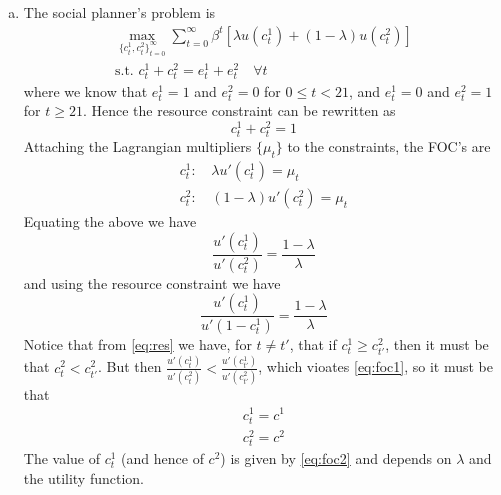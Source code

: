 \documentclass{article}
\begin{document}
\section{}

\begin{enumerate}[(a)]
  \item The social planner's problem is
    \begin{gather*}
      \max_{\{c_t^1,c_t^2\}_{t=0}^\infty}\sum_{t=0}^\infty\beta^t\left[\lambda u(c_t^1)+(1-\lambda)u(c_t^2)\right]\\
      \text{s.t. } c_t^1+c_t^2=e_t^1+e_t^2\quad\forall t
    \end{gather*}
    where we know that $e_t^1=1$ and $e_t^2=0$ for $0\le t<21$, and $e_t^1=0$ and $e_t^2=1$ for $t\ge 21$. Hence the resource constraint can be rewritten as
    \begin{equation}
      \label{eq:res}
      c_t^1+c_t^2=1
    \end{equation}
    Attaching the Lagrangian multipliers $\{\mu_t\}$ to the constraints, the FOC's are
    \begin{align*}
      c_t^1  : &\, \lambda u'(c_t^1)=\mu_t\\
      c_t^2  : &\, (1-\lambda)u'(c_t^2)=\mu_t
    \end{align*}
    Equating the above we have
    \begin{equation}
      \label{eq:foc1}
      \frac{u'(c_t^1)}{u'(c_t^2)}=\frac{1-\lambda}{\lambda}
    \end{equation}
    and using the resource constraint we have
    \begin{equation}
      \label{eq:foc2}
      \frac{u'(c_t^1)}{u'(1-c_t^1)}=\frac{1-\lambda}{\lambda}
    \end{equation}
    Notice that from \eqref{eq:res} we have, for $t\ne t'$, that if
    $c_t^1\ge c_{t'}^2$, then it must be that $c_t^2<c_{t'}^2$. But
    then
    $\frac{u'(c_t^1)}{u'(c_t^2)}<\frac{u'(c_{t'}^1)}{u'(c_{t'}^2)}$,
    which vioates \eqref{eq:foc1}, so it must be that
    \begin{gather*}
      c_t^1=c^1\\
      c_t^2=c^2
    \end{gather*}
    The value of $c_t^1$ (and hence of $c^2$) is given by
    \eqref{eq:foc2} and depends on $\lambda$ and the utility function.
    


\end{enumerate}
\end{document}
